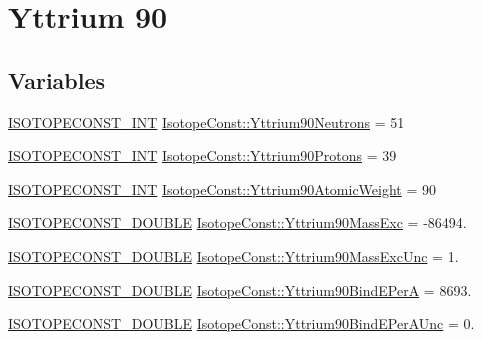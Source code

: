 \hypertarget{group___isotope_const-_yttrium-_y90}{}\section{Yttrium 90}
\label{group___isotope_const-_yttrium-_y90}
\subsection*{Variables}
\begin{DoxyCompactItemize}
\item 
\mbox{\hyperlink{group___isotope_const-_macros_ga5f18360b3e99483a35c32d789e62621c}{I\+S\+O\+T\+O\+P\+E\+C\+O\+N\+S\+T\+\_\+\+I\+NT}} \mbox{\hyperlink{group___isotope_const-_yttrium-_y90_gaa0e7475783249c4e1c0eaf0f9a605cce}{Isotope\+Const\+::\+Yttrium90\+Neutrons}} = 51
\item 
\mbox{\hyperlink{group___isotope_const-_macros_ga5f18360b3e99483a35c32d789e62621c}{I\+S\+O\+T\+O\+P\+E\+C\+O\+N\+S\+T\+\_\+\+I\+NT}} \mbox{\hyperlink{group___isotope_const-_yttrium-_y90_gaca3d9a5749d049b3c27460e5a33dac44}{Isotope\+Const\+::\+Yttrium90\+Protons}} = 39
\item 
\mbox{\hyperlink{group___isotope_const-_macros_ga5f18360b3e99483a35c32d789e62621c}{I\+S\+O\+T\+O\+P\+E\+C\+O\+N\+S\+T\+\_\+\+I\+NT}} \mbox{\hyperlink{group___isotope_const-_yttrium-_y90_ga0abaf0ac8cfdc625594f0bc994b8cb4b}{Isotope\+Const\+::\+Yttrium90\+Atomic\+Weight}} = 90
\item 
\mbox{\hyperlink{group___isotope_const-_macros_ga8f45a7272ce02c0b4c65c44636ed719a}{I\+S\+O\+T\+O\+P\+E\+C\+O\+N\+S\+T\+\_\+\+D\+O\+U\+B\+LE}} \mbox{\hyperlink{group___isotope_const-_yttrium-_y90_gad9efb4364a916e875096fe646fc2bc62}{Isotope\+Const\+::\+Yttrium90\+Mass\+Exc}} = -\/86494.
\item 
\mbox{\hyperlink{group___isotope_const-_macros_ga8f45a7272ce02c0b4c65c44636ed719a}{I\+S\+O\+T\+O\+P\+E\+C\+O\+N\+S\+T\+\_\+\+D\+O\+U\+B\+LE}} \mbox{\hyperlink{group___isotope_const-_yttrium-_y90_ga5b6ec6cf8fcfa4e0cdca7dbbfdd56149}{Isotope\+Const\+::\+Yttrium90\+Mass\+Exc\+Unc}} = 1.
\item 
\mbox{\hyperlink{group___isotope_const-_macros_ga8f45a7272ce02c0b4c65c44636ed719a}{I\+S\+O\+T\+O\+P\+E\+C\+O\+N\+S\+T\+\_\+\+D\+O\+U\+B\+LE}} \mbox{\hyperlink{group___isotope_const-_yttrium-_y90_gadcda3124c0848fde1b54b8f0a1912fa3}{Isotope\+Const\+::\+Yttrium90\+Bind\+E\+PerA}} = 8693.
\item 
\mbox{\hyperlink{group___isotope_const-_macros_ga8f45a7272ce02c0b4c65c44636ed719a}{I\+S\+O\+T\+O\+P\+E\+C\+O\+N\+S\+T\+\_\+\+D\+O\+U\+B\+LE}} \mbox{\hyperlink{group___isotope_const-_yttrium-_y90_gabd5ad1befddcaa3586cf2ae80708ccc4}{Isotope\+Const\+::\+Yttrium90\+Bind\+E\+Per\+A\+Unc}} = 0.

\end{DoxyCompactItemize}
